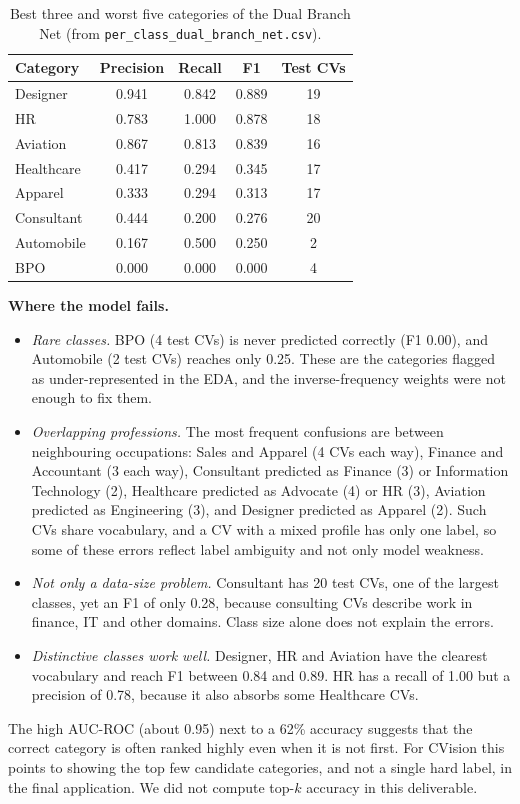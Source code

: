 \documentclass[11pt,a4paper]{article}
\begin{document}
\begin{table}[htbp]
  \centering
  \small
  \begin{tabular}{@{}lcccc@{}}
    \toprule
    Category & Precision & Recall & F1 & Test CVs \\
    \midrule
    Designer & 0.941 & 0.842 & 0.889 & 19 \\
    HR & 0.783 & 1.000 & 0.878 & 18 \\
    Aviation & 0.867 & 0.813 & 0.839 & 16 \\
    \midrule
    Healthcare & 0.417 & 0.294 & 0.345 & 17 \\
    Apparel & 0.333 & 0.294 & 0.313 & 17 \\
    Consultant & 0.444 & 0.200 & 0.276 & 20 \\
    Automobile & 0.167 & 0.500 & 0.250 & 2 \\
    BPO & 0.000 & 0.000 & 0.000 & 4 \\
    \bottomrule
  \end{tabular}
  \caption{Best three and worst five categories of the Dual Branch Net
  (from \texttt{per\_class\_dual\_branch\_net.csv}).}
  \label{tab:perclass}
\end{table}

\textbf{Where the model fails.}
\begin{itemize}
  \item \emph{Rare classes.} BPO (4 test CVs) is never predicted correctly
  (F1 0.00), and Automobile (2 test CVs) reaches only 0.25. These are the
  categories flagged as under-represented in the EDA, and the inverse-frequency
  weights were not enough to fix them.
  \item \emph{Overlapping professions.} The most frequent confusions are
  between neighbouring occupations: Sales and Apparel (4 CVs each way),
  Finance and Accountant (3 each way), Consultant predicted as Finance (3) or
  Information Technology (2), Healthcare predicted as Advocate (4) or HR (3),
  Aviation predicted as Engineering (3), and Designer predicted as Apparel
  (2). Such CVs share vocabulary, and a CV with a mixed profile has only one
  label, so some of these errors reflect label ambiguity and not only model
  weakness.
  \item \emph{Not only a data-size problem.} Consultant has 20 test CVs, one
  of the largest classes, yet an F1 of only 0.28, because consulting CVs
  describe work in finance, IT and other domains. Class size alone does not
  explain the errors.
  \item \emph{Distinctive classes work well.} Designer, HR and Aviation have
  the clearest vocabulary and reach F1 between 0.84 and 0.89. HR has a
  recall of 1.00 but a precision of 0.78, because it also absorbs some
  Healthcare CVs.
\end{itemize}
The high AUC-ROC (about 0.95) next to a 62\% accuracy suggests that the correct
category is often ranked highly even when it is not first. For CVision this
points to showing the top few candidate categories, and not a single hard label,
in the final application. We did not compute top-$k$ accuracy in this
deliverable.
\end{document}
